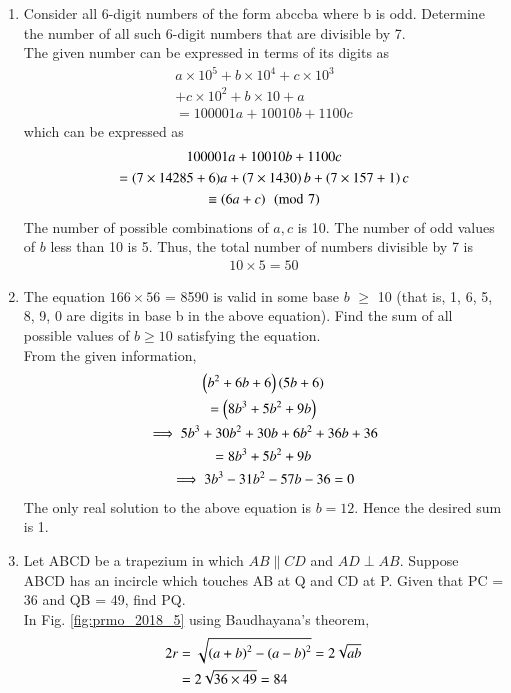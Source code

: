 \documentclass[journal,12pt,twocolumn]{IEEEtran}
\renewcommand\thesection{\arabic{section}}
\begin{document}
\begin{enumerate}[label=\thesection.\arabic*,ref=\thesection.\theenumi]
\item  Consider all 6-digit numbers of the form abccba where b is odd. Determine the number of all such 6-digit numbers that are divisible by 7. 
\\
\solution The given number can be expressed in terms of its digits as
\begin{multline}
a\times 10^5+b\times 10^4+c\times 10^3
\\
+c\times 10^2
+b\times 10+a
\\
=100001a+10010b+1100c
\end{multline}
%
which can be expressed as
\begin{multline}
100001a+10010b+1100c 
\\
= (7\times14285+6)a+\left(7\times1430\right)b+\left(7\times157+1\right)c
\\
\equiv \left(6a+c\right)\pmod{7}
\end{multline}
%
The number of possible combinations of $a,c$ is 10.  The number of odd values of $b$ less than 10 is 5.  Thus, the total number of numbers divisible by 7 is 
\begin{align}
10\times 5 = 50
\end{align}

\item The equation $166\times 56$ = 8590 is valid in some base $b$ 
$\ge$ 10 (that is, 1, 6, 5, 8, 9, 0 are digits in base b in the above equation). Find the sum of all possible values of $b \ge  10$ satisfying the equation. 
%
\\
\solution From the given information,
\begin{multline}
\left(b^2+6b+6\right)\left(5b+6\right) \\= \left(8b^3+5b^2+9b\right)
\\
\implies 5b^3+30b^2+30b+6b^2+36b+36 \\= 8b^3+5b^2+9b
\\
\implies 3b^3-31b^2-57b-36 =0
\end{multline}
%
The only real solution to the above equation is $b=12$.  Hence the desired sum is 1.
\item Let ABCD be a trapezium in which $AB \parallel CD$ and $AD \perp AB$. Suppose ABCD has an incircle which touches AB at Q and CD at P. Given that PC = 36 and QB = 49, find PQ. 
\\
\solution In Fig. \ref{fig:prmo_2018_5} using Baudhayana's theorem,
\begin{align}
2r &= \sqrt{\left(a+b\right)^2-\left(a-b\right)^2} = 2\sqrt{ab} 
\\
&= 2\sqrt{36\times 49}=84
\end{align}


\end{enumerate}
\end{document}
